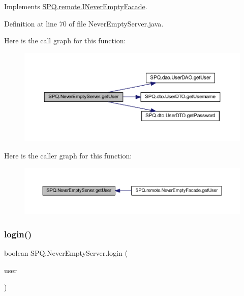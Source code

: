 Implements \mbox{\hyperlink{interface_s_p_q_1_1remote_1_1_i_never_empty_facade_aa329dfc23ab0832e73802bf2df90b9e0}{S\+P\+Q.\+remote.\+I\+Never\+Empty\+Facade}}.



Definition at line 70 of file Never\+Empty\+Server.\+java.

Here is the call graph for this function\+:
\nopagebreak
\begin{figure}[H]
\begin{center}
\leavevmode
\includegraphics[width=350pt]{class_s_p_q_1_1_never_empty_server_abb18bd0d72ecb8790068f206c592c58d_cgraph}
\end{center}
\end{figure}
Here is the caller graph for this function\+:
\nopagebreak
\begin{figure}[H]
\begin{center}
\leavevmode
\includegraphics[width=350pt]{class_s_p_q_1_1_never_empty_server_abb18bd0d72ecb8790068f206c592c58d_icgraph}
\end{center}
\end{figure}
\mbox{\label{class_s_p_q_1_1_never_empty_server_a79e3b01cc25be204f24e01c7fccbef13}} 
\subsubsection{\texorpdfstring{login()}{login()}}
{\footnotesize\ttfamily boolean S\+P\+Q.\+Never\+Empty\+Server.\+login (\begin{DoxyParamCaption}\item[{\mbox{\hyperlink{class_s_p_q_1_1dto_1_1_user_d_t_o}{User\+D\+TO}}}]{user }\end{DoxyParamCaption})}



